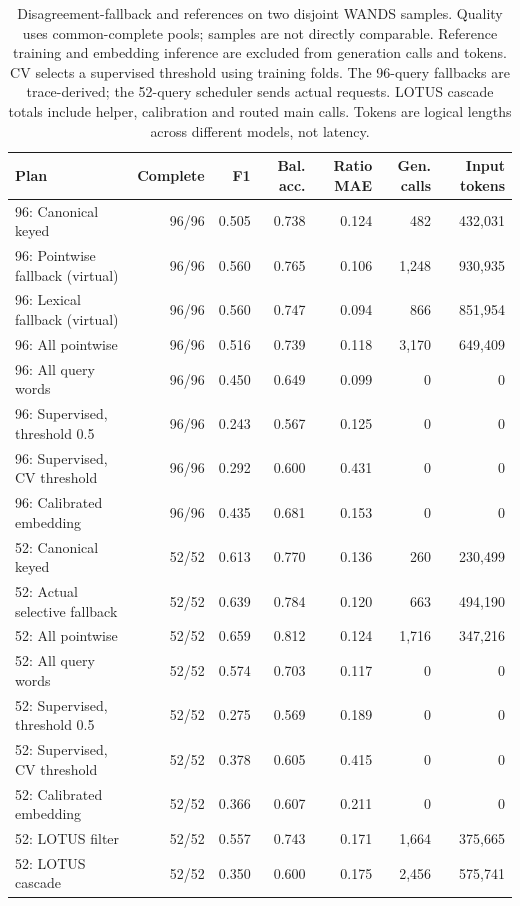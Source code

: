 \documentclass[conference]{IEEEtran}
\begin{document}
\begin{table}[t]
\caption{Disagreement-fallback and references on two disjoint WANDS samples. Quality uses common-complete pools; samples are not directly comparable. Reference training and embedding inference are excluded from generation calls and tokens. CV selects a supervised threshold using training folds. The 96-query fallbacks are trace-derived; the 52-query scheduler sends actual requests. LOTUS cascade totals include helper, calibration and routed main calls. Tokens are logical lengths across different models, not latency.}
\label{tab:fallback}
\centering\small
\begin{tabular}{lrrrrrr}
\toprule
Plan & Complete & F1 & Bal. acc. & Ratio MAE & Gen. calls & Input tokens \\
\midrule
96: Canonical keyed & 96/96 & 0.505 & 0.738 & 0.124 & 482 & 432,031 \\
96: Pointwise fallback (virtual) & 96/96 & 0.560 & 0.765 & 0.106 & 1,248 & 930,935 \\
96: Lexical fallback (virtual) & 96/96 & 0.560 & 0.747 & 0.094 & 866 & 851,954 \\
96: All pointwise & 96/96 & 0.516 & 0.739 & 0.118 & 3,170 & 649,409 \\
96: All query words & 96/96 & 0.450 & 0.649 & 0.099 & 0 & 0 \\
96: Supervised, threshold 0.5 & 96/96 & 0.243 & 0.567 & 0.125 & 0 & 0 \\
96: Supervised, CV threshold & 96/96 & 0.292 & 0.600 & 0.431 & 0 & 0 \\
96: Calibrated embedding & 96/96 & 0.435 & 0.681 & 0.153 & 0 & 0 \\
52: Canonical keyed & 52/52 & 0.613 & 0.770 & 0.136 & 260 & 230,499 \\
52: Actual selective fallback & 52/52 & 0.639 & 0.784 & 0.120 & 663 & 494,190 \\
52: All pointwise & 52/52 & 0.659 & 0.812 & 0.124 & 1,716 & 347,216 \\
52: All query words & 52/52 & 0.574 & 0.703 & 0.117 & 0 & 0 \\
52: Supervised, threshold 0.5 & 52/52 & 0.275 & 0.569 & 0.189 & 0 & 0 \\
52: Supervised, CV threshold & 52/52 & 0.378 & 0.605 & 0.415 & 0 & 0 \\
52: Calibrated embedding & 52/52 & 0.366 & 0.607 & 0.211 & 0 & 0 \\
52: LOTUS filter & 52/52 & 0.557 & 0.743 & 0.171 & 1,664 & 375,665 \\
52: LOTUS cascade & 52/52 & 0.350 & 0.600 & 0.175 & 2,456 & 575,741 \\
\bottomrule
\end{tabular}
\end{table}
\end{document}
